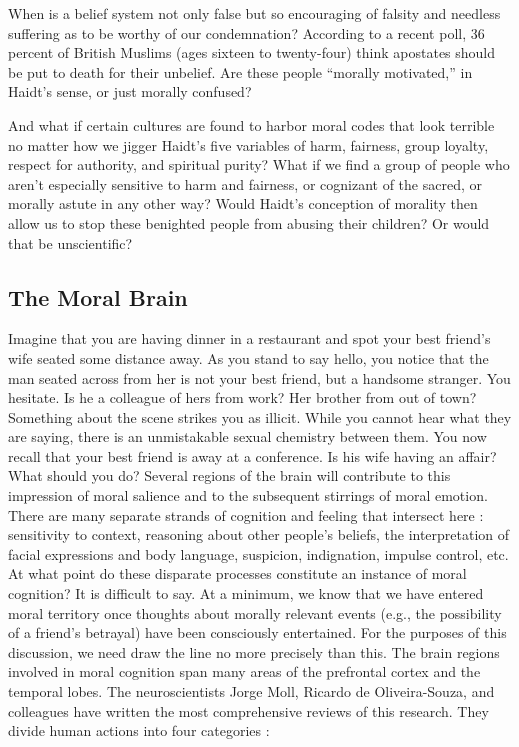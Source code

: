 \documentclass[a4paper,14pt]{extarticle}
\begin{document}
When is a belief system not only false but so encouraging of falsity and needless suffering as to be worthy of our condemnation?
According to a recent poll, 36 percent of British Muslims (ages sixteen to twenty-four) think apostates should be put to death for their unbelief.
Are these people ``morally motivated,'' in Haidt's sense, or just morally confused?

And what if certain cultures are found to harbor moral codes that look terrible no matter how we jigger Haidt's five variables of harm, fairness, group loyalty, respect for authority, and spiritual purity?
What if we find a group of people who aren't especially sensitive to harm and fairness, or cognizant of the sacred, or morally astute in any other way?
Would Haidt's conception of morality then allow us to stop these benighted people from abusing their children?
Or would that be unscientific?

\subsection{The Moral Brain}

Imagine that you are having dinner in a restaurant and spot your best friend's wife seated some distance away.
As you stand to say hello, you notice that the man seated across from her is not your best friend, but a handsome stranger.
You hesitate.
Is he a colleague of hers from work?
Her brother from out of town?
Something about the scene strikes you as illicit.
While you cannot hear what they are saying, there is an unmistakable sexual chemistry between them.
You now recall that your best friend is away at a conference.
Is his wife having an affair?
What should you do?
Several regions of the brain will contribute to this impression of moral salience and to the subsequent stirrings of moral emotion.
There are many separate strands of cognition and feeling that intersect here :
sensitivity to context, reasoning about other people's beliefs, the interpretation of facial expressions and body language, suspicion, indignation, impulse control, etc.
At what point do these disparate processes constitute an instance of moral cognition?
It is difficult to say.
At a minimum, we know that we have entered moral territory once thoughts about morally relevant events (e.g., the possibility of a friend's betrayal) have been consciously entertained.
For the purposes of this discussion, we need draw the line no more precisely than this.
The brain regions involved in moral cognition span many areas of the prefrontal cortex and the temporal lobes.
The neuroscientists Jorge Moll, Ricardo de Oliveira-Souza, and colleagues have written the most comprehensive reviews of this research.
They divide human actions into four categories :
\end{document}
